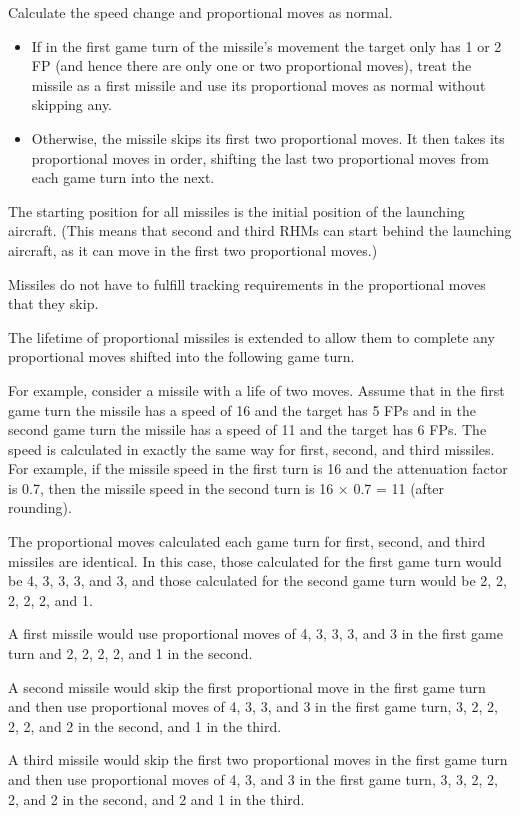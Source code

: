{Calculate the speed change and proportional moves as normal.
\begin{itemize}
    \item If in the first game turn of the missile’s movement the target only has 1 or 2 FP (and hence there are only one or two proportional moves), treat the missile as a first missile and use its proportional moves as normal without skipping any.
    \item Otherwise, the missile skips its first two proportional moves. It then takes its proportional moves in order, shifting the last two proportional moves from each game turn into the next.
\end{itemize}

The starting position for all missiles is the initial position of the launching aircraft. (This means that second and third RHMs can start behind the launching aircraft, as it can move in the first two proportional moves.)

Missiles do not have to fulfill tracking requirements in the proportional moves that they skip.

The lifetime of proportional missiles is extended to allow them to complete any proportional moves shifted into the following game turn.

For example, consider a missile with a life of two moves. Assume that in the first game turn the missile has a speed of 16 and the target has 5 FPs and in the second game turn the missile has a speed of 11 and the target has 6 FPs.
The speed is calculated in exactly the same way for first, second, and third missiles. For example, if the missile speed in the first turn is 16 and the attenuation factor is 0.7, then the missile speed in the second turn is 16 × 0.7 = 11 (after rounding).

The proportional moves calculated each game turn for first, second, and third missiles are identical. In this case, those calculated for the first game turn would be 4, 3, 3, 3, and 3, and those calculated for the second game turn would be 2, 2, 2, 2, 2, and 1.

A first missile would use proportional moves of 4, 3, 3, 3, and 3 in the first game turn and 2, 2, 2, 2, and 1 in the second.

A second missile would skip the first proportional move in the first game turn and then use proportional moves of 4, 3, 3, and 3 in the first game turn, 3, 2, 2, 2, 2, and 2 in the second, and 1 in the third.

A third missile would skip the first two proportional moves in the first game turn and then use proportional moves of 4, 3,  and 3 in the first game turn, 3, 3, 2, 2, 2, and 2 in the second, and 2 and 1 in the third.

}

